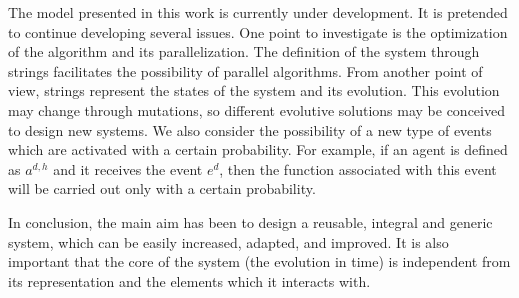 \documentclass{aamas2012}
\begin{document}
The model presented in this work is currently under development. It is pretended to continue
developing several issues. One point to investigate is the optimization of the algorithm and its parallelization. The definition of the system through
strings facilitates the possibility of parallel algorithms. From another point of view, strings
represent the states of the system and its evolution. This evolution may change through mutations,
so different evolutive solutions may be conceived to design new systems. We also consider the
possibility of a new type of events which are activated with a certain probability. For example, if
an agent is defined as $a^{d,h}$ and it receives the event $e^d$, then the function associated with
this event will be carried out only with a certain probability.

In conclusion, the main aim has been to design a reusable, integral and generic system, which can be easily
increased, adapted, and improved. It is also important that the core of the system (the evolution
in time) is independent from its representation and the elements which it interacts with.


%

  
%
%
\end{document}
